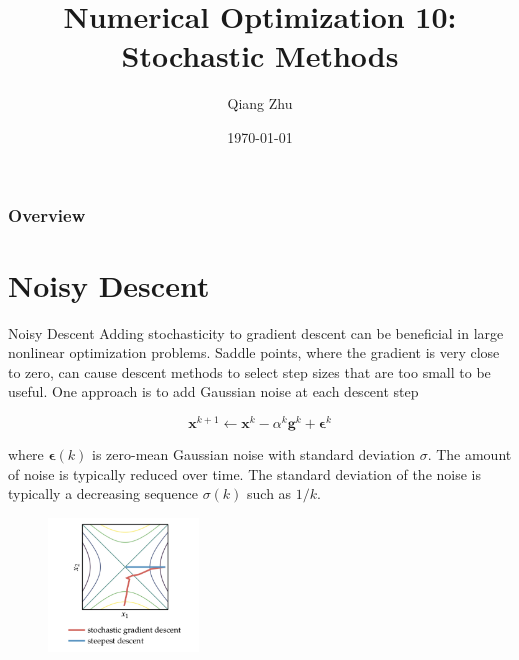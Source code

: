 \documentclass{beamer}
\title[Gradient Descent]{Numerical Optimization 10: Stochastic Methods} %
\author{Qiang Zhu} %
\institute[University of Nevada Las Vegas] %
{
University of Nevada Las Vegas\\ %
\medskip
}
\date{\today} %
\begin{document}
\begin{frame}
\titlepage %
\end{frame}

\begin{frame}
\frametitle{Overview} %
\tableofcontents %
\end{frame}



\section{Noisy Descent}
\begin{frame}{Noisy Descent}
Adding stochasticity to gradient descent can be beneficial in large nonlinear optimization problems. Saddle points, where the gradient is very close to zero, can cause descent methods to select step sizes that are too small to be useful. One approach is to add Gaussian noise at each descent step

\begin{equation*}
    \boldsymbol{x}^{k+1} \leftarrow \boldsymbol{x}^k - \alpha^k \boldsymbol{g}^k + \boldsymbol{\epsilon}^k
\end{equation*}

where $\boldsymbol{\epsilon}(k)$ is zero-mean Gaussian noise with standard deviation $\sigma$. The amount of noise is typically reduced over time. The standard deviation of the noise is typically a decreasing sequence $\sigma(k)$ such as $1/k$. 

\begin{figure}
\centering
\includegraphics[width=40mm]{Figs/sgd.jpeg}
\end{figure}   

\end{frame}
\end{document}
